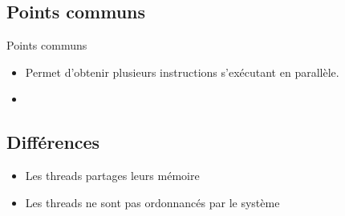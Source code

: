 \section{\sectitle}
\begin{frame}{\sectitle}
    \def\subsectitle{Points communs}
    \subsection{\subsectitle}
    \begin{block}{\subsectitle}
        \begin{itemize}
            \item Permet d'obtenir plusieurs instructions s'exécutant en
                parallèle.
            \item 
        \end{itemize}
    \end{block}

    \def\subsectitle{Différences}
    \subsection{\subsectitle}
    \begin{block}
        \begin{itemize}
            \item Les threads partages leurs mémoire
            \item Les threads ne sont pas ordonnancés par le système
        \end{itemize}
    \end{block}
\end{frame}




